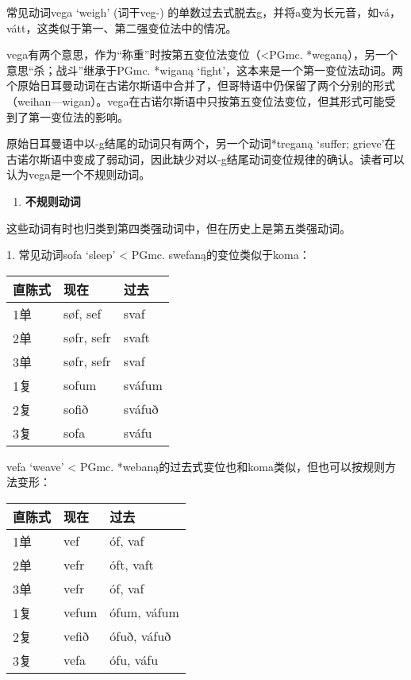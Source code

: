 常见动词vega `weigh‌' (词干veg-)
的单数过去式脱去g，并将a变为长元音，如vá，vátt，这类似于第一、第二强变位法中的情况。

vega有两个意思，作为``称重''时按第五变位法变位（\textless PGmc.
*weganą），另一个意思``杀；战斗''继承于PGmc. *wiganą
`fight'，这本来是一个第一变位法动词。两个原始日耳曼动词在古诺尔斯语中合并了，但哥特语中仍保留了两个分别的形式（weihan---wigan）。vega在古诺尔斯语中只按第五变位法变位，但其形式可能受到了第一变位法的影响。

原始日耳曼语中以-g结尾的动词只有两个，另一个动词*treganą `suffer;
grieve'在古诺尔斯语中变成了弱动词，因此缺少对以-g结尾动词变位规律的确认。读者可以认为vega是一个不规则动词。

\begin{enumerate}
  \def\labelenumi{\arabic{enumi})}
  \setcounter{enumi}{2}
  \item
        \textbf{不规则动词}
\end{enumerate}

这些动词有时也归类到第四类强动词中，但在历史上是第五类强动词。

1. 常见动词sofa `sleep‌' \textless{} PGmc. swefaną的变位类似于koma：

\begin{longtable}{lll}
  \toprule
  直陈式 & 现在       & 过去   \\
  \midrule
  \endhead
  \bottomrule
  \endfoot
  1单    & søf, sef   & svaf   \\
  2单    & søfr, sefr & svaft  \\
  3单    & søfr, sefr & svaf   \\
  1复    & sofum      & sváfum \\
  2复    & sofið      & sváfuð \\
  3复    & sofa       & sváfu  \\
\end{longtable}

vefa `weave' \textless{} PGmc.
*webaną的过去式变位也和koma类似，但也可以按规则方法变形：

\begin{longtable}{lll}
  \toprule
  直陈式 & 现在  & 过去        \\
  \midrule
  \endhead
  \bottomrule
  \endfoot
  1单    & vef   & óf, vaf     \\
  2单    & vefr  & óft, vaft   \\
  3单    & vefr  & óf, vaf     \\
  1复    & vefum & ófum, váfum \\
  2复    & vefið & ófuð, váfuð \\
  3复    & vefa  & ófu, váfu   \\
\end{longtable}

